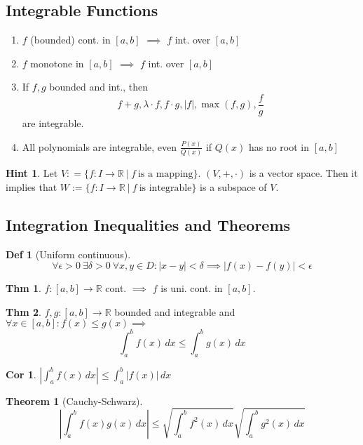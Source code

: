 \documentclass[a4paper, 10pt]{article}
\newtheorem*{corollary}{Cor}
\theoremstyle{definition}
\newtheorem*{theorem}{Thm}
\newtheorem*{definition}{Def}
\newtheorem*{note_wrapper}{Hint}
\theoremstyle{named}
\newtheorem*{ntheorem_wrapper}{Theorem}
\newenvironment{ntheorem}%
    {\begin{mdframed}[style=important]\begin{ntheorem_wrapper}}%
    {\end{ntheorem_wrapper}\end{mdframed}}
\newenvironment{note}%
    {\begin{mdframed}[style=trick]\begin{note_wrapper}}%
    {\end{note_wrapper}\end{mdframed}}
\newcommand{\R}{\mathbb{R}}
\begin{document}
\subsection{Integrable Functions}
\begin{enumerate}
    \item $f$ (bounded) cont. in $[a, b]$ $\implies$ $f$ int. over $[a, b]$
    \item $f$ monotone in $[a, b]$ $\implies$ $f$ int. over $[a, b]$
    \item If $f, g$ bounded and int., then
    $$f + g, \lambda \cdot f, f \cdot g, |f|, \max(f,g), \frac{f}{g}$$ are integrable.
    \item All polynomials are integrable, even $\frac{P(x)}{Q(x)}$ if $Q(x)$ has no root in $[a, b]$
\end{enumerate}

\begin{note}
    Let $V: = \{f: I \to \R \ | \ f \ \text{is a mapping}\}$. $(V, +, \cdot)$ is a vector space.
    Then it implies that $W := \{f: I \to \R \ | \ f \ \text{is integrable}\}$ is a subspace of $V$.
\end{note}

\subsection{Integration Inequalities and Theorems}
\begin{definition}[Uniform continuous]
    $$\forall \epsilon > 0 \ \exists \delta > 0 \ \forall x,y \in D: |x - y| < \delta \implies |f(x) - f(y)| < \epsilon $$
\end{definition}

\begin{theorem}
    $f: [a, b] \to \R$ cont. $\implies$ $f$ is uni. cont. in $[a, b]$.
\end{theorem}

\begin{theorem}
    $f, g: [a, b] \to \R$ bounded and integrable and $\forall x \in [a, b]: f(x) \leq g(x) \implies$
    $$\int_a^b f(x) \,dx \leq \int_a^b g(x) \,dx$$
\end{theorem}

\begin{corollary}
    $|\int_a^b f(x) \,dx| \leq \int_a^b |f(x)| \,dx$
\end{corollary}

\begin{ntheorem}[Cauchy-Schwarz]
    $$\left|\int_a^b f(x)g(x) \,dx\right| \leq \sqrt{\int_a^b f^2(x) \,dx}\sqrt{\int_a^b g^2(x) \,dx}$$
\end{ntheorem}
\end{document}

